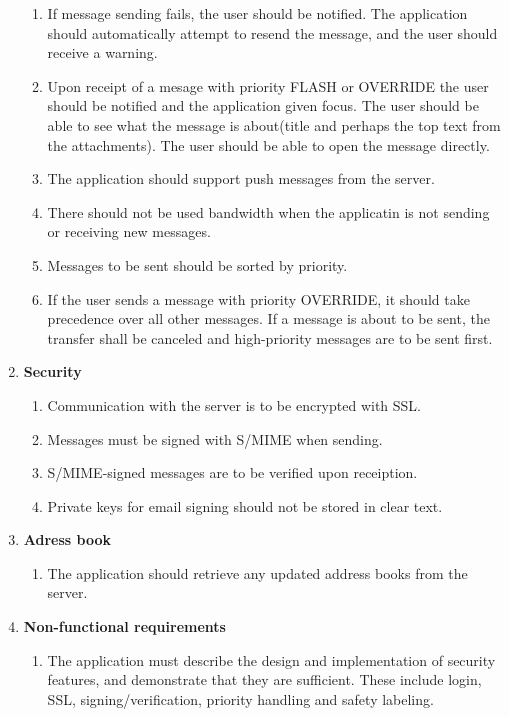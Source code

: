 \begin{enumerate}
\begin{enumerate}
\item{}If message sending fails, the user should be notified. The application should automatically attempt to resend the message, and the user should receive a warning.
\item{}Upon receipt of a mesage with priority FLASH or OVERRIDE the user should be notified and the application given focus. The user should be able to see what the message is about(title and perhaps the top text from the attachments). The user should be able to open the message directly.
\item{}The application should support push messages from the server.
\item{}There should not be used bandwidth when the applicatin is not sending or receiving new messages.
\item{}Messages to be sent should be sorted by priority.
\item{}If the user sends a message with priority OVERRIDE, it should take precedence over all other messages. If a message is about to be sent, the transfer shall be canceled and high-priority messages are to be sent first.
\end{enumerate}
\item{}\textbf{Security}
\begin{enumerate}
\item{}Communication with the server is to be encrypted with SSL.
\item{}Messages must be signed with S/MIME when sending.
\item{}S/MIME-signed messages are to be verified upon receiption.
\item{}Private keys for email signing should not be stored in clear text.
\end{enumerate}
\item{}\textbf{Adress book}
\begin{enumerate}
\item{}The application should retrieve any updated address books from the server.
\end{enumerate}
\item{}\textbf{Non-functional requirements}
\begin{enumerate}
\item{}The application must describe the design and implementation of security features, and demonstrate that they are sufficient. These include login, SSL, signing/verification, priority handling and safety labeling.
\end{enumerate}
\end{enumerate}
